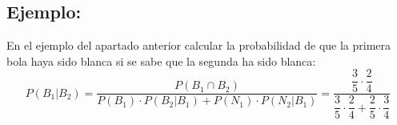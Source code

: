 \subsection{Ejemplo:} En el ejemplo del apartado anterior calcular la probabilidad de que la primera bola haya sido blanca si se sabe que la segunda ha sido blanca:
$$P(B_1|B_2)=\dfrac{P(B_1 \cap B_2)}{P(B_1)\cdot  P(B_2|B_1)+P(N_1)\cdot  P(N_2|B_1)}=\dfrac{\dfrac{3}{5}\cdot\dfrac{2}{4}}{\dfrac{3}{5}\cdot\dfrac{2}{4} + \dfrac{2}{5}\cdot\dfrac{3}{4}}$$